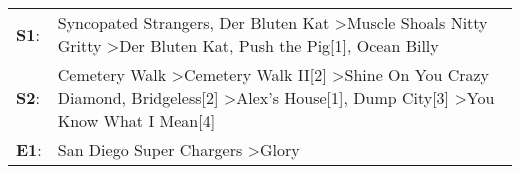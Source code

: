 \begin{supertabular}{p{0.03\textwidth}p{0.92\textwidth}}
 \textbf{S1}:  &                                                                            Syncopated Strangers\textsuperscript{}, \enspace Der Bluten Kat\textsuperscript{} \textgreater \enspace Muscle Shoals Nitty Gritty\textsuperscript{} \textgreater \enspace Der Bluten Kat\textsuperscript{}, \enspace Push the Pig[1]\textsuperscript{}, \enspace Ocean Billy\textsuperscript{}  \enspace  \\
 \textbf{S2}:  &  Cemetery Walk\textsuperscript{} \textgreater \enspace Cemetery Walk II[2]\textsuperscript{} \textgreater \enspace Shine On You Crazy Diamond\textsuperscript{}, \enspace Bridgeless[2]\textsuperscript{} \textgreater \enspace Alex's House[1]\textsuperscript{}, \enspace Dump City[3]\textsuperscript{} \textgreater \enspace You Know What I Mean[4]\textsuperscript{}  \enspace  \\
 \textbf{E1}:  &                                                                                                                                                                                                                                                                                   San Diego Super Chargers\textsuperscript{} \textgreater \enspace Glory\textsuperscript{}  \enspace  \\
\end{supertabular}
